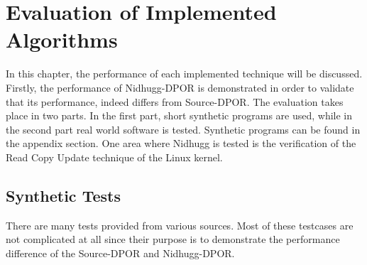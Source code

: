 \chapter{Evaluation of Implemented Algorithms}
\label{Chapter 4}

In this chapter, the performance of each implemented technique will be discussed. Firstly, the performance of
Nidhugg-DPOR is demonstrated in order to validate that its performance, indeed differs from Source-DPOR. The evaluation
takes place in two parts. In the first part, short synthetic programs are used, while in the second part real world
software is tested. Synthetic programs can be found in the appendix section. One area where Nidhugg is tested is the
verification of the Read Copy Update technique of the Linux kernel.


\section{Synthetic Tests}
There are many tests provided from various sources. Most of these testcases are not complicated at all since their
purpose is to demonstrate the performance difference of the Source-DPOR and Nidhugg-DPOR.

